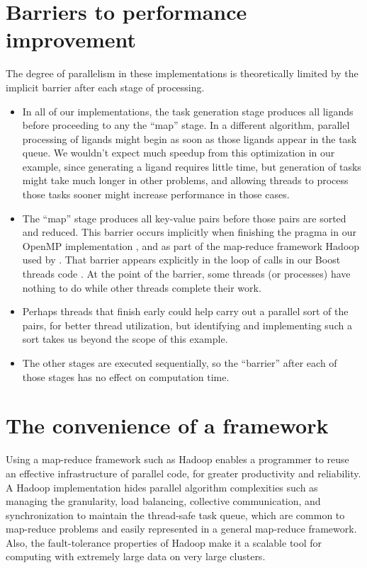 \documentclass[letterpaper,10pt,openany,oneside]{sphinxmanual}
\begin{document}
\section{Barriers to performance improvement}
\label{evaluation/evaluation:barriers-to-performance-improvement}
The degree of parallelism in these implementations is theoretically limited by the implicit barrier after each stage of processing.
\begin{itemize}
\item {} 
In all of our implementations, the task generation stage produces all ligands before proceeding to any the “map” stage.  In a different algorithm, parallel processing of ligands might begin as soon as those ligands appear in the task queue. We wouldn’t expect much speedup from this optimization in our example, since generating a ligand requires little time, but generation of tasks might take much longer in other problems, and allowing threads to process those tasks sooner might increase performance in those cases.

\item {} 
The “map” stage produces all key-value pairs before those pairs are sorted and reduced. This barrier occurs implicitly when finishing the  pragma in our OpenMP implementation , and as part of the map-reduce framework Hadoop used by . That barrier appears explicitly in the loop of  calls in our Boost threads code . At the point of the barrier, some threads (or processes) have nothing to do while other threads complete their work.

\item {} 
Perhaps threads that finish early could help carry out a parallel sort of the pairs, for better thread utilization, but identifying and implementing such a sort takes us beyond the scope of this example.

\item {} 
The other stages are executed sequentially, so the ``barrier'' after each of those stages has no effect on computation time.

\end{itemize}


\section{The convenience of a framework}
\label{evaluation/evaluation:the-convenience-of-a-framework}
Using a map-reduce framework such as Hadoop enables a programmer to reuse an effective infrastructure of parallel code, for greater productivity and reliability. A Hadoop implementation hides parallel algorithm complexities such as managing the granularity, load balancing, collective communication, and synchronization to maintain the thread-safe task queue, which are common to map-reduce problems and easily represented in a general map-reduce framework. Also, the fault-tolerance properties of Hadoop make it a scalable tool for computing with extremely large data on very large clusters.
\end{document}
